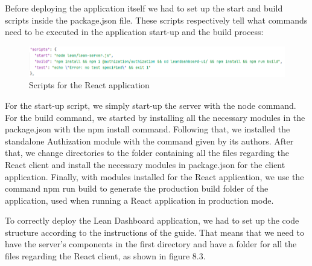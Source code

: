 \documentclass[a4paper,twoside,10pt]{report}
\begin{document}
Before deploying the application itself we had to set up the start and build scripts inside the package.json file. These scripts respectively tell what commands need to be executed in the application start-up and the build process:


\begin{figure}[h!]
\center
  \includegraphics[width=\textwidth]{packageJsonScripts.png}
\caption{Scripts for the React application}
\end{figure}

For the start-up script, we simply start-up the server with the node command. For the build command, we started by installing all the necessary modules in the package.json with the npm install command. Following that, we installed the standalone Authization module with the command given by its authors.
After that, we change directories to the folder containing all the files regarding the React client and install the necessary modules in package.json for the client application.
Finally, with modules installed for the React application, we use the command npm run build to generate the production build folder of the application, used when running a React application in production mode.

To correctly deploy the Lean Dashboard application, we had to set up the code structure according to the instructions of the guide. That means that we need to have the server's components in the first directory and have a folder for all the files regarding the React client, as shown in figure 8.3.
\end{document}
